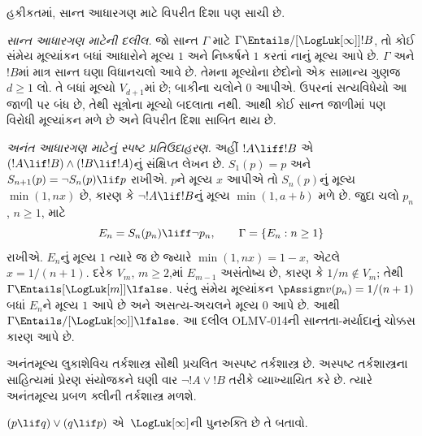 હકીકતમાં, સાન્ત આધારગણ માટે વિપરીત દિશા પણ સાચી છે.

\emph{સાન્ત આધારગણ માટેની દલીલ.}
જો સાન્ત $\Gamma$ માટે $\Gamma\Entails/[\LogLuk[\infty]]!B$,
તો કોઈ સંમેય મૂલ્યાંકન બધાં આધારોને મૂલ્ય $1$ અને
નિષ્કર્ષને $1$ કરતાં નાનું મૂલ્ય આપે છે. $\Gamma$ અને $!B$માં
માત્ર સાન્ત ઘણા વિધાનચલો આવે છે. તેમના મૂલ્યોના છેદોનો
એક સામાન્ય ગુણજ $d\ge1$ લો. તે બધાં મૂલ્યો $V_{d+1}$માં છે;
બાકીના ચલોને $0$ આપીએ. ઉપરનાં સત્યવિધેયો આ જાળી પર બંધ છે,
તેથી સૂત્રોના મૂલ્યો બદલાતા નથી. આથી કોઈ સાન્ત જાળીમાં
પણ વિરોધી મૂલ્યાંકન મળે છે અને વિપરીત દિશા સાબિત થાય છે.

\emph{અનંત આધારગણ માટેનું સ્પષ્ટ પ્રતિઉદાહરણ.}
અહીં $!A\liff!B$ એ $(!A\lif!B)\land(!B\lif!A)$નું સંક્ષિપ્ત
લેખન છે. $S_1(p)=p$ અને
$S_{n+1}(p)=\lnot S_n(p)\lif p$ રાખીએ. $p$ને મૂલ્ય $x$ આપીએ
તો $S_n(p)$નું મૂલ્ય $\min(1,nx)$ છે, કારણ કે
$\lnot !A\lif!B$નું મૂલ્ય $\min(1,a+b)$ મળે છે.
જુદા ચલો $p_n$, $n\ge1$, માટે
\[
 E_n=S_n(p_n)\liff\lnot p_n,\qquad
 \Gamma=\{E_n:n\ge1\}
\]
રાખીએ. $E_n$નું મૂલ્ય $1$ ત્યારે જ છે જ્યારે
$\min(1,nx)=1-x$, એટલે $x=1/(n+1)$.
દરેક $V_m$, $m\ge2$,માં $E_{m-1}$ અસંતોષ્ય છે,
કારણ કે $1/m\notin V_m$; તેથી
$\Gamma\Entails[\LogLuk[m]]\lfalse$.
પરંતુ સંમેય મૂલ્યાંકન $\pAssign v(p_n)=1/(n+1)$ બધાં
$E_n$ને મૂલ્ય $1$ આપે છે અને અસત્ય-અચલને મૂલ્ય $0$ આપે છે.
આથી $\Gamma\Entails/[\LogLuk[\infty]]\lfalse$.
આ દલીલ OLMV-014ની સાન્તતા-મર્યાદાનું ચોક્કસ કારણ આપે છે.

અનંતમૂલ્ય લુકાશેવિચ તર્કશાસ્ત્ર સૌથી પ્રચલિત અસ્પષ્ટ
તર્કશાસ્ત્ર છે. અસ્પષ્ટ તર્કશાસ્ત્રના સાહિત્યમાં પ્રેરણ સંયોજકને
ઘણી વાર $\lnot !A \lor !B$ તરીકે વ્યાખ્યાયિત કરે છે. ત્યારે
અનંતમૂલ્ય પ્રબળ ક્લીની તર્કશાસ્ત્ર મળશે.

\begin{prob}
  $(p \lif q) \lor (q \lif p)$ એ~$\LogLuk[\infty]$ની
  પુનરુક્તિ છે તે બતાવો.
\end{prob}
\endgroup


\begingroup
\makeatletter{}\makeatother


\label{guunit:OLP-0401}


